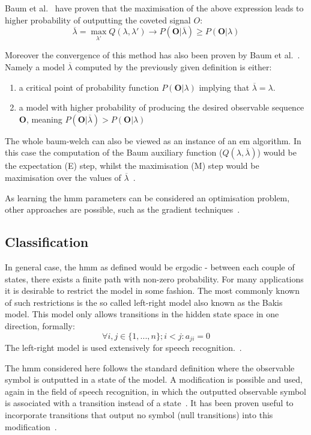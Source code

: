 Baum et al.~\cite{baum1968, baum1970, baker1975} have proven that the maximisation of the above expression leads to higher probability of outputting the coveted signal $O$:
$$\overline{\lambda}=\max_{\lambda'}{Q(\lambda,\lambda')} \rightarrow P(\mathbf{O}|\overline{\lambda}) \geq P(\mathbf{O}|\lambda)$$

Moreover the convergence of this method has also been proven by Baum et al.~\cite{baum1968, baker1975}. Namely a model $\overline{\lambda}$ computed by the previously given definition is either:
\begin{enumerate}
\item a critical point of probability function $P(\mathbf{O}|\lambda)$ implying that $\overline{\lambda}=\lambda$.
\item a model with higher probability of producing the desired observable sequence $\mathbf{O}$, meaning $P(\mathbf{O}|\overline{\lambda}) > P(\mathbf{O}|\lambda)$
\end{enumerate}

The whole \gls{baum-welch} can also be viewed as an instance of an \gls{em} algorithm. In this case the computation of the Baum auxiliary function ($Q(\lambda,\overline{\lambda})$) would be the expectation (E) step, whilst the maximisation (M) step would be maximisation over the values of $\overline{\lambda}$~\cite{Dempster1977, Rabiner89hmm}.

As learning the \gls{hmm} parameters can be considered an optimisation problem, other approaches are possible, such as the gradient techniques~\cite{levinson1983, Rabiner89hmm}.

\subsection{Classification}

In general case, the \gls{hmm} as defined would be ergodic - between each couple of states, there exists a finite path with non-zero probability. For many applications it is desirable to restrict the model in some fashion. The most commonly known of such restrictions is the so called left-right model also known as the Bakis model. This model only allows transitions in the hidden state space in one direction, formally: $$\forall i,j \in \{1, ..., n\}; i < j: a_{ji} = 0$$
The left-right model is used extensively for speech recognition.~\cite{bakis1976, jelinek1976}.

The \gls{hmm} considered here follows the standard definition where the observable symbol is outputted in a state of the model. A modification is possible and used, again in the field of speech recognition, in which the outputted observable symbol is associated with a transition instead of a state~\cite{Rabiner89hmm, jelinek1983}. It has been proven useful to incorporate transitions that output no symbol (null transitions) into this modification~\cite{jelinek1983}.

